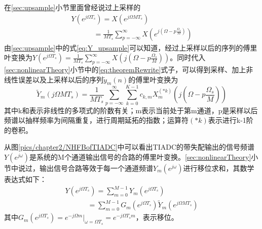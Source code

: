 		
		在\ref{sec:upsample}小节里面曾经说过上采样的
				\begin{equation}
				\begin{array}{l}
Y\left( {{e^{j\Omega {T_s}}}} \right) = X\left( {{e^{j\Omega M{T_s}}}} \right)\\
\,\,\,\,\,\,\,\,\,\,\,\,\,\,\,\,\,\,\, = \frac{1}{{M{T_s}}}\sum\limits_{p =  - \infty }^\infty  {X\left( {{e^{j\left( {\Omega  - p\frac{{{\Omega _s}}}{M}} \right)}}} \right)} 
\end{array} 
			\end{equation}
		由\ref{sec:upsample}中的式\ref{eq:Y_upsample}可以知道，经过上采样以后的序列的傅里叶变换为$Y\left( {{e^{j\Omega {T_s}}}} \right) = \frac{1}{{M{T_s}}}\sum\limits_{p =  - \infty }^\infty  {X\left( {j\left( {\Omega  - p\frac{{{\Omega _s}}}{M}} \right)} \right)} $。同时代入
		\ref{sec:nonlinearTheory}小节中的\ref{eq:theoremRewrite}式子，可以得到采样、加上非线性误差以及上采样以后的序列${{\tilde y}_m}\left( n \right)$的傅里叶变换为
			\begin{equation}
				{\tilde Y_m}\left( {j\Omega M{T_s}} \right) = \frac{1}{{M{T_s}}}\sum\limits_{p =  - \infty }^\infty  {\sum\limits_{k = 0}^{K - 1} {{c_{k,m}}X_m^{\left( {*k} \right)}\left( {j\left( {\Omega  - p\frac{{{\Omega _s}}}{M}} \right)} \right)} }  \label{eq:Y_mWithError}
			\end{equation}
		其中k和表示非线性的多项式的阶数有关；m表示当前处于第m通道，p是采样以后频谱以抽样频率为间隔重复，进行周期延拓的指数；运算符$(*k)$表示进行k-1阶的卷积。\par
		从图\ref{pics/chapter2/NHFBofTIADC}中可以看出TIADC的带失配输出的信号频谱$Y(e^{j\omega })$是系统的M个通道输出信号的合路的傅里叶变换。\ref{sec:nonlinearTheory}小节中说过，输出信号合路等效于每一个通道频谱${Y_m}(e^{j\omega })$进行移位求和，其数学表达式如下：
			\begin{equation}
				\begin{array}{l}
Y\left( {{e^{j\Omega {T_s}}}} \right) = \sum\limits_{m = 0}^{M - 1} {{Y_m}\left( {{e^{j\Omega {T_s}}}} \right)} \\
\,\,\,\,\,\,\,\,\,\,\,\,\,\,\,\,\,\,\, = \sum\limits_{m = 0}^{M - 1} {{G_m}\left( {{e^{j\Omega {T_s}}}} \right){{\tilde Y}_m}\left( {{e^{j\Omega M{T_s}}}} \right)} 
\end{array}   \label{eq:combiner}
			\end{equation}
		其中${G_m}({e^{j\Omega {T_s}}}) = {e^{ - j\Omega m}}{|_{\omega  = \Omega {T_s}}} = {e^{ - j\Omega {T_s}m}}$，表示移位。
		\par
		
